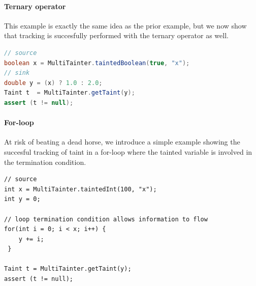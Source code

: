 \documentclass[a4paper]{article}
\begin{document}
\paragraph{Ternary operator}
This example is exactly the same idea as the prior example, but we now show that tracking is succesfully
performed with the ternary operator as well.

\begin{lstlisting}[language=java]
// source
boolean x = MultiTainter.taintedBoolean(true, "x");
// sink
double y = (x) ? 1.0 : 2.0;
Taint t  = MultiTainter.getTaint(y);
assert (t != null);
\end{lstlisting}


\paragraph{For-loop}
At risk of beating a dead horse, we introduce a simple example showing the succesful tracking
of taint in a for-loop where the tainted variable is involved in the termination condition.

\begin{lstlisting}
// source
int x = MultiTainter.taintedInt(100, "x");
int y = 0;

// loop termination condition allows information to flow
for(int i = 0; i < x; i++) {
    y += i;
 }

Taint t = MultiTainter.getTaint(y);
assert (t != null);
\end{lstlisting}


\nocite{*}


\end{document}
